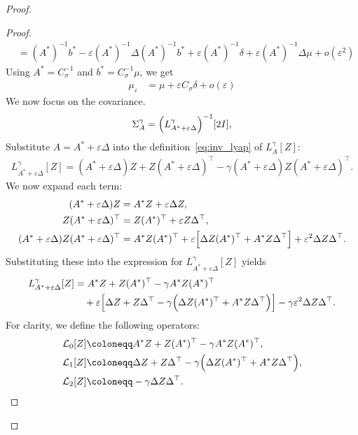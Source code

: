 \documentclass[11pt]{article}
\newcommand{\eqdef}{\coloneqq}
\begin{document}
\begin{proof}
\begin{proof}
\begin{align*}
 &= (A^*)^{-1}b^* - \varepsilon (A^*)^{-1} \Delta (A^*)^{-1} b^* + \varepsilon (A^*)^{-1} \delta  + \varepsilon (A^*)^{-1} \Delta \mu + o(\varepsilon^2)
 \end{align*}
Using $A^* = C_\sigma^{-1}$ and $b^* = C_\sigma^{-1} \mu$, we get 
  \begin{align*}
 \mu_\varepsilon &= \mu + \varepsilon C_\sigma  \delta  + o(\varepsilon)
 \end{align*}
We now focus on the covariance.
 \begin{align*}
\Sigma^\gamma_{A} = \Bigl(L^\gamma_{A^*+\varepsilon\Delta}\Bigr)^{-1}[2I],
\end{align*}
Substitute $A = A^* + \varepsilon\Delta$ into the definition~\eqref{eq:inv_lyap} of $L^\gamma_A[Z]$:
 \begin{align*}
L^\gamma_{A^*+\varepsilon\Delta}[Z] = (A^*+\varepsilon\Delta)Z + Z(A^*+\varepsilon\Delta)^\top - \gamma  (A^*+\varepsilon\Delta)Z (A^*+\varepsilon\Delta)^\top.
 \end{align*}
We now expand each term:
 \begin{align*}
\begin{aligned}
(A^*+\varepsilon\Delta)Z &= A^* Z + \varepsilon   \Delta Z,\\
Z(A^*+\varepsilon\Delta)^\top &= Z (A^*)^\top + \varepsilon   Z \Delta^\top,\\
(A^*+\varepsilon\Delta) Z (A^*+\varepsilon\Delta)^\top 
&= A^*Z (A^*)^\top + \varepsilon\Bigl[\Delta Z (A^*)^\top + A^*Z \Delta^\top\Bigr] + \varepsilon^2   \Delta Z \Delta^\top.
\end{aligned}
 \end{align*}
Substituting these into the expression for $L^\gamma_{A^*+\varepsilon\Delta}[Z]$ yields
 \begin{align*}
L^\gamma_{A^*+\varepsilon\Delta}[Z] &= A^*Z + Z (A^*)^\top - \gamma   A^*Z (A^*)^\top\\ \nonumber
&\quad {}+ \varepsilon\Bigl[\Delta Z + Z \Delta^\top - \gamma\Bigl(\Delta Z (A^*)^\top + A^*Z \Delta^\top\Bigr)\Bigr] - \gamma  \varepsilon^2   \Delta Z \Delta^\top.
 \end{align*}
For clarity, we define the following operators:
 \begin{align*}
\mathcal{L}_0[Z] &\eqdef A^*Z + Z (A^*)^\top - \gamma   A^*Z (A^*)^\top,\\
\mathcal{L}_1[Z] &\eqdef \Delta Z + Z \Delta^\top - \gamma\Bigl(\Delta Z (A^*)^\top + A^*Z \Delta^\top\Bigr),\\
\mathcal{L}_2[Z] &\eqdef - \gamma   \Delta Z \Delta^\top.

\end{align*}
\end{proof}
\end{proof}
\end{document}
